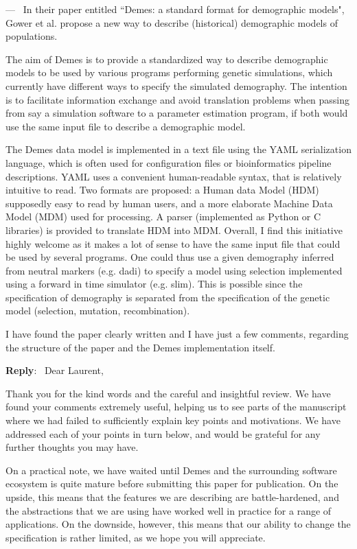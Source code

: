 \documentclass[11pt]{article}
\newcounter{reviewer}
\newcounter{point}[reviewer]
\renewcommand{\thepoint}{\thereviewer.\arabic{point}}
\newenvironment{point}
   {\refstepcounter{point} \bigskip \noindent {\textbf{Reviewer~Point~\thepoint} } ---\ }
   {\par }
\newenvironment{reply}
   {\medskip \noindent \begin{sf}\textbf{Reply}:\  }
   {\medskip \end{sf}}
\begin{document}
\begin{point}
In their paper entitled ``Demes: a standard format for demographic models",
Gower et al. propose a new way to describe (historical) demographic models of
populations.

The aim of Demes is to provide a standardized way to describe demographic
models to be used by various programs performing genetic simulations, which
currently have different ways to specify the simulated demography. The
intention is to facilitate information exchange and avoid translation problems
when passing from say a simulation software to a parameter estimation program,
if both would use the same input file to describe a demographic model.

The Demes data model is implemented in a text file using the YAML serialization
language, which is often used for configuration files or bioinformatics
pipeline descriptions. YAML uses a convenient human-readable syntax, that is
relatively intuitive to read. Two formats are proposed: a Human data Model
(HDM) supposedly easy to read by human users, and a more elaborate Machine Data
Model (MDM) used for processing. A parser (implemented as Python or C
libraries) is provided to translate HDM into MDM. Overall, I find this
initiative highly welcome as it makes a lot of sense to have the same input
file that could be used by several programs. One could thus use a given
demography inferred from neutral markers (e.g. dadi) to specify a model using
selection implemented using a forward in time simulator (e.g. slim). This is
possible since the specification of demography is separated from the
specification of the genetic model (selection, mutation, recombination).

I have found the paper clearly written and I have just a few comments,
regarding the structure of the paper and the Demes implementation itself.
\end{point}
\begin{reply}
Dear Laurent,

Thank you for the kind words and the careful and insightful review.
We have found your comments extremely useful, helping us to see
parts of the manuscript where we had failed to sufficiently explain
key points and motivations. We have addressed each of your points
in turn below, and would be grateful for any further thoughts
you may have.

On a practical note, we have waited until Demes and the surrounding
software ecosystem is quite mature before submitting this paper
for publication. On the upside, this means that the features
we are describing are battle-hardened, and the abstractions that
we are using have worked well in practice for a range of
applications. On the downside, however, this means that our ability
to change the specification is rather limited, as we hope you
will appreciate.

\end{reply}
\end{document}
